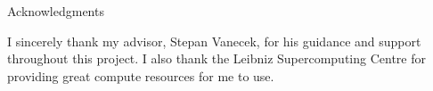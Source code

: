 \thispagestyle{empty}

\vspace*{20mm}

\begin{center}
{ Acknowledgments}
\end{center}

\vspace{10mm}

I sincerely thank my advisor, Stepan Vanecek, for his guidance and support throughout this project.
I also thank the Leibniz Supercomputing Centre for providing great compute resources for me to use.

\cleardoublepage{}
